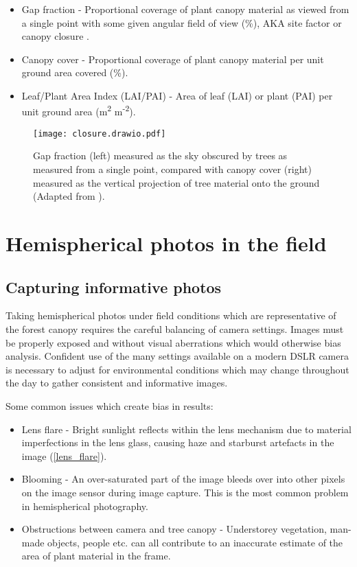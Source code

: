 \documentclass{article}
\begin{document}
\begin{itemize}
	\item{Gap fraction - Proportional coverage of plant canopy material as viewed from a single point with some given angular field of view (\%), AKA site factor or canopy closure \citep{Anderson1964}.}
	\item{Canopy cover - Proportional coverage of plant canopy material per unit ground area covered (\%).}
	\item{Leaf/Plant Area Index (LAI/PAI) - Area of leaf (LAI) or plant (PAI) per unit ground area (m\textsuperscript{2} m\textsuperscript{-2}).}
\end{itemize}

\begin{figure}[H]
\centering
	\texttt{[image: closure.drawio.pdf]}
	\caption{Gap fraction (left) measured as the sky obscured by trees as measured from a single point, compared with canopy cover (right) measured as the vertical projection of tree material onto the ground (Adapted from \citealt{Jennings1999}).}
	\label{closure}
\end{figure}

\section{Hemispherical photos in the field}

\subsection{Capturing informative photos}

Taking hemispherical photos under field conditions which are representative of the forest canopy requires the careful balancing of camera settings. Images must be properly exposed and without visual aberrations which would otherwise bias analysis. Confident use of the many settings available on a modern DSLR camera is necessary to adjust for environmental conditions which may change throughout the day to gather consistent and informative images.

Some common issues which create bias in results:

\begin{itemize}
	\item{Lens flare - Bright sunlight reflects within the lens mechanism due to material imperfections in the lens glass, causing haze and starburst artefacts in the image (\autoref{lens_flare}).}
	\item{Blooming - An over-saturated part of the image bleeds over into other pixels on the image sensor during image capture. This is the most common problem in hemispherical photography.}
	\item{Obstructions between camera and tree canopy - Understorey vegetation, man-made objects, people etc. can all contribute to an inaccurate estimate of the area of plant material in the frame.}
\end{itemize}
\end{document}
